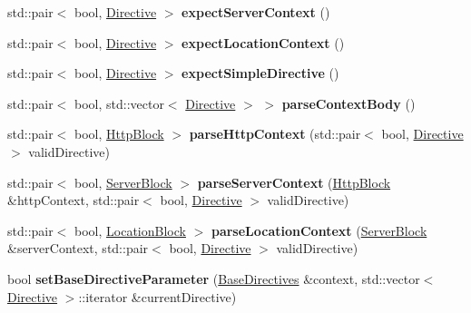 \begin{DoxyCompactItemize}
std\+::pair$<$ bool, \hyperlink{classft_1_1Directive}{Directive} $>$ {\bfseries expect\+Server\+Context} ()
\item 
\mbox{\label{classft_1_1Parser_a6a6e7f4d7ed21085cc78be7da4457b51}} 
std\+::pair$<$ bool, \hyperlink{classft_1_1Directive}{Directive} $>$ {\bfseries expect\+Location\+Context} ()
\item 
\mbox{\label{classft_1_1Parser_aaa390a0ed2901a4a15ee4d9fd6958211}} 
std\+::pair$<$ bool, \hyperlink{classft_1_1Directive}{Directive} $>$ {\bfseries expect\+Simple\+Directive} ()
\item 
\mbox{\label{classft_1_1Parser_aedfb84f8ee089723f0d50ed91a44f0ea}} 
std\+::pair$<$ bool, std\+::vector$<$ \hyperlink{classft_1_1Directive}{Directive} $>$ $>$ {\bfseries parse\+Context\+Body} ()
\item 
\mbox{\label{classft_1_1Parser_a2dc59f01862f66a93cb5d8385fc8a451}} 
std\+::pair$<$ bool, \hyperlink{classft_1_1HttpBlock}{Http\+Block} $>$ {\bfseries parse\+Http\+Context} (std\+::pair$<$ bool, \hyperlink{classft_1_1Directive}{Directive} $>$ valid\+Directive)
\item 
\mbox{\label{classft_1_1Parser_aca4dfdabb592d9e82355de4e669b5ea8}} 
std\+::pair$<$ bool, \hyperlink{classft_1_1ServerBlock}{Server\+Block} $>$ {\bfseries parse\+Server\+Context} (\hyperlink{classft_1_1HttpBlock}{Http\+Block} \&http\+Context, std\+::pair$<$ bool, \hyperlink{classft_1_1Directive}{Directive} $>$ valid\+Directive)
\item 
\mbox{\label{classft_1_1Parser_a34a2c50ab4096cc4ed9edd4a4601719e}} 
std\+::pair$<$ bool, \hyperlink{classft_1_1LocationBlock}{Location\+Block} $>$ {\bfseries parse\+Location\+Context} (\hyperlink{classft_1_1ServerBlock}{Server\+Block} \&server\+Context, std\+::pair$<$ bool, \hyperlink{classft_1_1Directive}{Directive} $>$ valid\+Directive)
\item 
\mbox{\label{classft_1_1Parser_acee75deb20ac867f931086d32229bbae}} 
bool {\bfseries set\+Base\+Directive\+Parameter} (\hyperlink{classft_1_1BaseDirectives}{Base\+Directives} \&context, std\+::vector$<$ \hyperlink{classft_1_1Directive}{Directive} $>$\+::iterator \&current\+Directive)

\end{DoxyCompactItemize}
